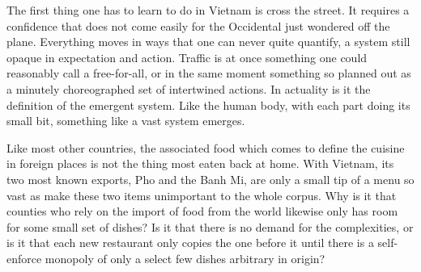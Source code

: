 \documentclass[ebook, 10pt, openright, onecolumn]{memoir}
\begin{document}
The first thing one has to learn to do in Vietnam is cross the street.  It
requires a confidence that does not come easily for the Occidental just wondered
off the plane.  Everything moves in ways that one can never quite quantify, a
system still opaque in expectation and action.  Traffic is at once something one
could reasonably call a free-for-all, or in the same moment something so planned
out as a minutely choreographed set of intertwined actions.  In actuality is it
the definition of the emergent system. Like the human body, with each part doing
its small bit, something like a vast system emerges.

Like most other countries, the associated food which comes to define the cuisine
in foreign places is not the thing most eaten back at home. With Vietnam, its
two most known exports, Pho and the Banh Mi, are only a small tip of a menu so
vast as make these two items unimportant to the whole corpus.  Why is it that
counties who rely on the import of food from the world likewise only has room
for some small set of dishes?  Is it that there is no demand for the
complexities, or is it that each new restaurant only copies the one before it
until there is a self-enforce monopoly of only a select few dishes arbitrary in
origin?
\end{document}
